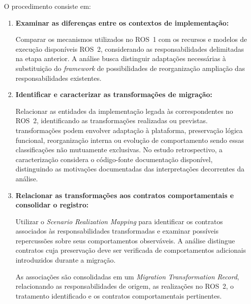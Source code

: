 O procedimento consiste em:

\begin{enumerate}

    \item \textbf{Examinar as diferenças entre os
    contextos de implementação:}

    Comparar os mecanismos utilizados no ROS~1 com os recursos e modelos de execução disponíveis ROS~2, considerando as responsabilidades delimitadas na etapa anterior. A análise busca distinguir adaptações necessárias à substituição do \textit{framework} de possibilidades de reorganização ampliação das responsabilidades existentes.

    \item \textbf{Identificar e caracterizar
    as transformações de migração:}

    Relacionar as entidades da implementação legada às correspondentes no ROS~2, identificando as transformações realizadas ou previstas. transformações podem envolver adaptação à plataforma, preservação lógica funcional, reorganização interna ou evolução de comportamento sendo essas classificações não mutuamente exclusivas. No estudo retrospectivo, a caracterização considera o código-fonte documentação disponível, distinguindo as motivações documentadas das interpretações decorrentes da análise.

    \item \textbf{Relacionar as transformações
    aos contratos comportamentais e
    consolidar o registro:}

    Utilizar o \textit{Scenario Realization
    Mapping} para identificar os contratos
    associados às responsabilidades
    transformadas e examinar possíveis
    repercussões sobre seus comportamentos
    observáveis. A análise distingue contratos cuja
    preservação deve ser verificada de
    comportamentos adicionais introduzidos
    durante a migração.

    As associações são consolidadas em um
    \textit{Migration Transformation Record},
    relacionando as responsabilidades de
    origem, as realizações no ROS~2,
    o tratamento identificado e os
    contratos comportamentais pertinentes.

\end{enumerate}


